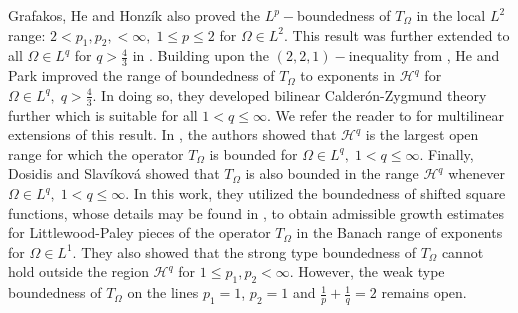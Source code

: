 \documentclass[a4paper,reqno]{amsart}
\theoremstyle{definition}
\numberwithin{equation}{section}
\begin{document}
Grafakos, He and Honz\'ik \cite{GHH2018} also proved the $L^p-$boundedness of $T_\Omega$ in the local $L^2$ range: $2<p_1,p_2,<\infty,\;1\leq p\leq 2$ for $\Omega\in L^2$. This result was further extended to all $\Omega\in L^q$ for $q>\frac{4}{3}$ in \cite{GHS2020}. Building upon the $(2,2,1)-$inequality from \cite{GHH2018}, He and Park \cite{HP2023} improved the range of boundedness of $T_\Omega$ to exponents in $\mathcal{H}^q$ for $\Omega\in L^q,\;q>\frac{4}{3}$. In doing so, they developed bilinear Calder\'on-Zygmund theory further which is suitable for all $1<q\leq\infty$. We refer the reader to \cite{GHHP2023,GHHP2024} for multilinear extensions of this result. In \cite{GHS2019}, the authors showed that $\mathcal{H}^q$ is the largest open range for which the operator $T_\Omega$ is bounded for $\Omega\in L^q,\;1<q\leq\infty$. Finally, Dosidis and Slav\'ikov\'a \cite{DosidisSlavikova} showed that $T_\Omega$ is also bounded in the range $\mathcal{H}^q$ whenever $\Omega\in L^q,\;1<q\leq\infty$.  In this work, they utilized the boundedness of shifted square functions, whose details may be found in \cite{Muscalu}, to obtain admissible growth estimates for Littlewood-Paley pieces of the operator $T_\Omega$ in the Banach range of exponents for $\Omega\in L^1$. They also showed that the strong type boundedness of $T_\Omega$ cannot hold outside the region $\mathcal{H}^q$ for $1\leq p_1,p_2<\infty$. However, the weak type boundedness of $T_\Omega$ on the lines $p_1=1$, $p_2=1$ and $\frac{1}{p}+\frac{1}{q}=2$ remains open.
\end{document}
